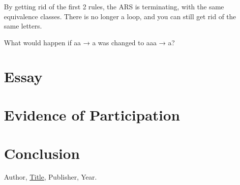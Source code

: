 \documentclass{article}
\theoremstyle{theorem}
\theoremstyle{definition}
\theoremstyle{remark}
\begin{document}
By getting rid of the first 2 rules, the ARS is terminating, with the same equivalence classes. There is no longer a loop, and you can still get rid of the same letters.

What would happen if aa → a was changed to aaa → a?

\section{Essay}

\section{Evidence of Participation}

\section{Conclusion}\label{conclusion}

\begin{thebibliography}{99}
 Author, \href{https://en.wikipedia.org/wiki/LaTeX}{Title}, Publisher, Year.
\end{thebibliography}
\end{document}
